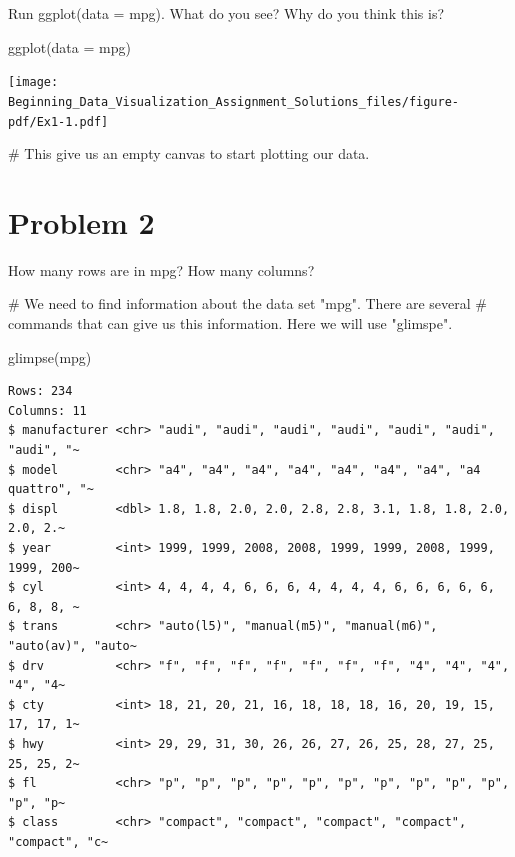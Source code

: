 \documentclass[
  letterpaper,
  DIV=11,
  numbers=noendperiod]{scrreprt}
\newenvironment{Shaded}{\begin{snugshade}}{\end{snugshade}}
\newcommand{\AttributeTok}[1]{\textcolor[rgb]{0.40,0.45,0.13}{#1}}
\newcommand{\CommentTok}[1]{\textcolor[rgb]{0.37,0.37,0.37}{#1}}
\newcommand{\FunctionTok}[1]{\textcolor[rgb]{0.28,0.35,0.67}{#1}}
\newcommand{\NormalTok}[1]{\textcolor[rgb]{0.00,0.23,0.31}{#1}}
\begin{document}
Run ggplot(data = mpg). What do you see? Why do you think this is?

\begin{Shaded}
\begin{Highlighting}[]
\FunctionTok{ggplot}\NormalTok{(}\AttributeTok{data =}\NormalTok{ mpg)}
\end{Highlighting}
\end{Shaded}

\texttt{[image: Beginning\_Data\_Visualization\_Assignment\_Solutions\_files/figure-pdf/Ex1-1.pdf]}

\begin{Shaded}
\begin{Highlighting}[]
\CommentTok{\# This give us an empty canvas to start plotting our data.}
\end{Highlighting}
\end{Shaded}

\section*{Problem 2}\label{problem-2-3}


How many rows are in mpg? How many columns?

\begin{Shaded}
\begin{Highlighting}[]
\CommentTok{\# We need to find information about the data set "mpg". There are several }
\CommentTok{\# commands that can give us this information. Here we will use "glimspe".}


\FunctionTok{glimpse}\NormalTok{(mpg)}
\end{Highlighting}
\end{Shaded}

\begin{verbatim}
Rows: 234
Columns: 11
$ manufacturer <chr> "audi", "audi", "audi", "audi", "audi", "audi", "audi", "~
$ model        <chr> "a4", "a4", "a4", "a4", "a4", "a4", "a4", "a4 quattro", "~
$ displ        <dbl> 1.8, 1.8, 2.0, 2.0, 2.8, 2.8, 3.1, 1.8, 1.8, 2.0, 2.0, 2.~
$ year         <int> 1999, 1999, 2008, 2008, 1999, 1999, 2008, 1999, 1999, 200~
$ cyl          <int> 4, 4, 4, 4, 6, 6, 6, 4, 4, 4, 4, 6, 6, 6, 6, 6, 6, 8, 8, ~
$ trans        <chr> "auto(l5)", "manual(m5)", "manual(m6)", "auto(av)", "auto~
$ drv          <chr> "f", "f", "f", "f", "f", "f", "f", "4", "4", "4", "4", "4~
$ cty          <int> 18, 21, 20, 21, 16, 18, 18, 18, 16, 20, 19, 15, 17, 17, 1~
$ hwy          <int> 29, 29, 31, 30, 26, 26, 27, 26, 25, 28, 27, 25, 25, 25, 2~
$ fl           <chr> "p", "p", "p", "p", "p", "p", "p", "p", "p", "p", "p", "p~
$ class        <chr> "compact", "compact", "compact", "compact", "compact", "c~
\end{verbatim}
\end{document}
